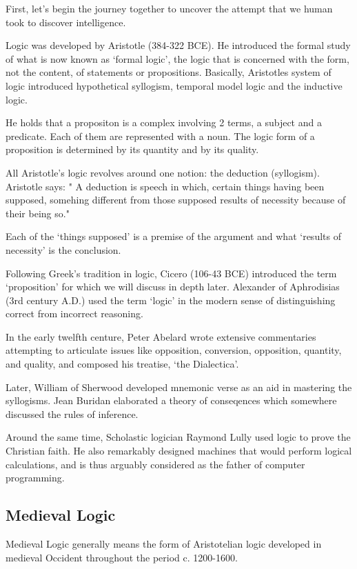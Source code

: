 \documentclass[]{book}
\theoremstyle{definition}
\theoremstyle{definition}
\theoremstyle{definition}
\theoremstyle{remark}
\begin{document}
First, let's begin the journey together to uncover the attempt that we
human took to discover intelligence.

Logic was developed by Aristotle (384-322 BCE). He introduced the formal
study of what is now known as `formal logic', the logic that is
concerned with the form, not the content, of statements or propositions.
Basically, Aristotles system of logic introduced hypothetical syllogism,
temporal model logic and the inductive logic.

He holds that a propositon is a complex involving 2 terms, a subject and
a predicate. Each of them are represented with a noun. The logic form of
a proposition is determined by its quantity and by its quality.

All Aristotle's logic revolves around one notion: the deduction
(syllogism). Aristotle says: " A deduction is speech in which, certain
things having been supposed, somehing different from those supposed
results of necessity because of their being so."

Each of the `things supposed' is a premise of the argument and what
`results of necessity' is the conclusion.

Following Greek's tradition in logic, Cicero (106-43 BCE) introduced the
term `proposition' for which we will discuss in depth later. Alexander
of Aphrodisias (3rd century A.D.) used the term `logic' in the modern
sense of distinguishing correct from incorrect reasoning.

In the early twelfth centure, Peter Abelard wrote extensive commentaries
attempting to articulate issues like opposition, conversion, opposition,
quantity, and quality, and composed his treatise, `the Dialectica'.

Later, William of Sherwood developed mnemonic verse as an aid in
mastering the syllogisms. Jean Buridan elaborated a theory of
conseqences which somewhere discussed the rules of inference.

Around the same time, Scholastic logician Raymond Lully used logic to
prove the Christian faith. He also remarkably designed machines that
would perform logical calculations, and is thus arguably considered as
the father of computer programming.

\subsection{Medieval Logic}\label{medieval-logic}

Medieval Logic generally means the form of Aristotelian logic developed
in medieval Occident throughout the period c. 1200-1600.
\end{document}

